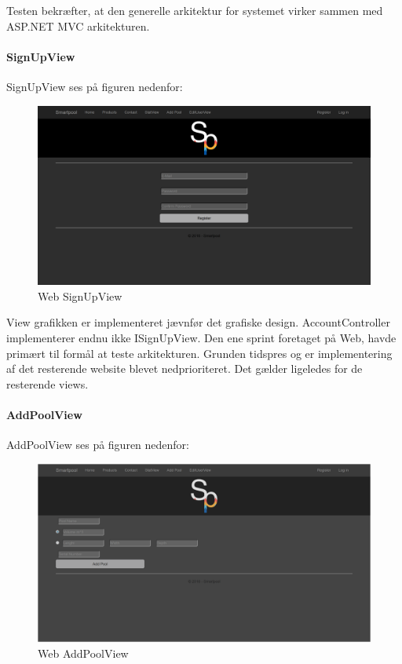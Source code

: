 Testen bekræfter, at den generelle arkitektur for systemet virker sammen med ASP.NET MVC arkitekturen. 
 
\paragraph{SignUpView}\label{sec: signupview}
SignUpView ses på figuren nedenfor:

\begin{figure}
	\centering
	\includegraphics[width=1.0\linewidth]{figs/implementering/web_signupview}
	\caption{Web SignUpView}
	\label{fig:websignupview}
\end{figure}

View grafikken er implementeret jævnfør det grafiske design. AccountController implementerer endnu ikke ISignUpView. Den ene sprint foretaget på Web, havde primært til formål at teste arkitekturen. Grunden tidspres og er implementering af det resterende website blevet nedprioriteret. Det gælder ligeledes for de resterende views.

\paragraph{AddPoolView}
AddPoolView ses på figuren nedenfor:

\begin{figure}
	\centering
	\includegraphics[width=1.0\linewidth]{figs/implementering/web_addpoolview}
	\caption{Web AddPoolView}
	\label{fig:webaddpoolview}
\end{figure}

